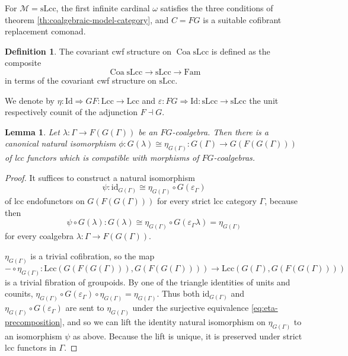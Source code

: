 \documentclass[a4paper]{article}
\newtheorem{lemma}[theorem]{Lemma}
\theoremstyle{remark}
\theoremstyle{definition}
\newtheorem{definition}[theorem]{Definition}
\begin{document}
For $\mathcal{M} = \mathrm{sLcc}$, the first infinite cardinal $\omega$ satisfies the three conditions of theorem \ref{th:coalgebraic-model-category}, and $C = FG$ is a suitable cofibrant replacement comonad.

\begin{definition}
  The covariant cwf structure on $\operatorname{Coa} \mathrm{sLcc}$ is defined as the composite
  \begin{equation}
    \operatorname{Coa} \mathrm{sLcc} \rightarrow \mathrm{sLcc} \rightarrow \mathrm{Fam}
  \end{equation}
  in terms of the covariant cwf structure on $\mathrm{sLcc}$.
\end{definition}

We denote by $\eta : \mathrm{Id} \Rightarrow G F : \mathrm{Lcc} \rightarrow \mathrm{Lcc}$ and $\varepsilon : F G \Rightarrow \mathrm{Id} : \mathrm{sLcc} \rightarrow \mathrm{sLcc}$ the unit respectively counit of the adjunction $F \dashv G$.

\begin{lemma}
  \label{lem:coalgebra-vs-eta}
  Let $\lambda : \Gamma \rightarrow F(G(\Gamma))$ be an $FG$-coalgebra.
  Then there is a canonical natural isomorphism $\phi : G(\lambda) \cong \eta_{G(\Gamma)} : G(\Gamma) \rightarrow G(F(G(\Gamma)))$ of lcc functors which is compatible with morphisms of $FG$-coalgebras.
\end{lemma}
\begin{proof}
  It suffices to construct a natural isomorphism
  \begin{equation}
    \psi : \mathrm{id}_{G(\Gamma)} \cong \eta_{G(\Gamma)} \circ G(\varepsilon_\Gamma)
  \end{equation}
  of lcc endofunctors on $G(F(G(\Gamma)))$ for every strict lcc category $\Gamma$, because then
  \begin{equation}
    \psi \circ G(\lambda) : G(\lambda) \cong \eta_{G(\Gamma)} \circ G(\varepsilon_\Gamma \lambda) = \eta_{G(\Gamma)}
  \end{equation}
  for every coalgebra $\lambda : \Gamma \rightarrow F(G(\Gamma))$.

  $\eta_{G(\Gamma)}$ is a trivial cofibration, so the map
  \begin{equation}
    \label{eq:eta-precomposition}
    - \circ \eta_{G(\Gamma)} : \mathrm{Lcc}(G(F(G(\Gamma))), G(F(G(\Gamma)))) \rightarrow \mathrm{Lcc}(G(\Gamma), G(F(G(\Gamma)))) 
  \end{equation}
  is a trivial fibration of groupoids.
  By one of the triangle identities of units and counits, $\eta_{G(\Gamma)} \circ G(\varepsilon_\Gamma) \circ \eta_{G(\Gamma)} = \eta_{G(\Gamma)}$.
  Thus both $\mathrm{id}_{G(\Gamma)}$ and $\eta_{G(\Gamma)} \circ G(\varepsilon_\Gamma)$ are sent to $\eta_{G(\Gamma)}$ under the surjective equivalence \eqref{eq:eta-precomposition}, and so we can lift the identity natural isomorphism on $\eta_{G(\Gamma)}$ to an isomorphism $\psi$ as above.
  Because the lift is unique, it is preserved under strict lcc functors in $\Gamma$.
\end{proof}
\end{document}
